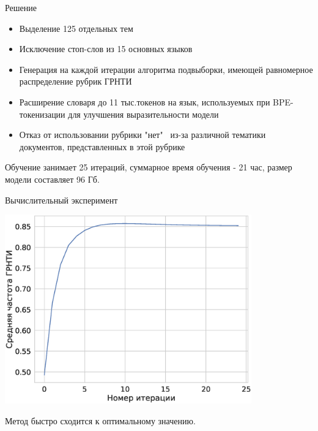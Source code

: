 \documentclass{beamer}
\begin{document}
\begin{frame}{Решение}

\begin{itemize}
    \item Выделение 125 отдельных тем
    \item Исключение стоп-слов из 15 основных языков
    \item Генерация на каждой итерации алгоритма подвыборки, имеющей равномерное распределение рубрик ГРНТИ
    \item Расширение словаря до 11 тыс.токенов на язык, используемых при BPE-токенизации для улучшения выразительности модели
    \item Отказ от использовании рубрики "нет" \ из-за различной тематики документов, представленных в этой рубрике
\end{itemize}

\bigskip
Обучение занимает 25 итераций, суммарное время обучения - 21 час, размер модели составляет 96 Гб.

\end{frame}
\begin{frame}{Вычислительный эксперимент}


\includegraphics[width=0.8\textwidth]{error.eps}

\bigskip
Метод быстро сходится к оптимальному значению.

\end{frame}
\end{document}
